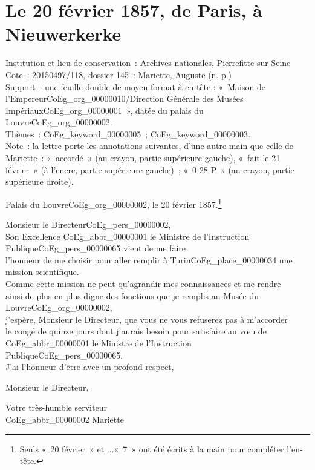 \documentclass{book}
\begin{document}
\section*{Le 20 février 1857, de Paris, à Nieuwerkerke}  
{\footnotesize \noindent Institution et lieu de conservation~: Archives nationales, Pierrefitte-sur-Seine\\
Cote~: \hyperlink{CoEg_Mariette_ms_001}{20150497/118, dossier 145~: Mariette, Auguste} (n. p.)\\
Support~: une feuille double de moyen format à en-tête : «~Maison de l'Empereur\gls{CoEg_org_00000010}/Direction Générale des Musées Impériaux\gls{CoEg_org_00000001}~», datée du palais du Louvre\gls{CoEg_org_00000002}.\\
Thèmes~: \gls{CoEg_keyword_00000005}~; \gls{CoEg_keyword_00000003}.\\
Note~: la lettre porte les annotations suivantes, d’une autre main que celle de Mariette~: «~accordé~» (au crayon, partie supérieure gauche), «~fait le 21 février~» (à l’encre, partie supérieure gauche)~; «~0 28 P~» (au crayon, partie supérieure droite).}
\begin{flushright}Palais du Louvre\gls{CoEg_org_00000002}, le 20 février 1857.\footnote{Seuls «~20 février~» et ...«~7~» ont été écrits à la main pour compléter l’en-tête.}\end{flushright} 

\hspace{1cm} Monsieur le Directeur\gls{CoEg_pers_00000002},\\

Son Excellence \gls{CoEg_abbr_00000001} le Ministre de l’Instruction Publique\gls{CoEg_pers_00000065} vient de me faire\\
l’honneur de me choisir pour aller remplir à Turin\gls{CoEg_place_00000034} une mission scientifique.\\
Comme cette mission ne peut qu’agrandir mes connaissances et me rendre\\
ainsi de plus en plus digne des fonctions que je remplis au Musée du Louvre\gls{CoEg_org_00000002},\\
j’espère, Monsieur le Directeur, que vous ne vous refuserez pas à m’accorder\\
le congé de quinze jours dont j’aurais besoin pour satisfaire au vœu de\\
\gls{CoEg_abbr_00000001} le Ministre de l’Instruction Publique\gls{CoEg_pers_00000065}.\\
\indent J’ai l’honneur d’être avec un profond respect,
\begin{center}Monsieur le Directeur,\end{center}
\begin{center}\hspace{5cm}Votre très-humble serviteur\\
\hspace{5cm} \gls{CoEg_abbr_00000002} Mariette\end{center}
\hypertarget{CoEg_Mariette_1857-10-26}{}
\end{document}
